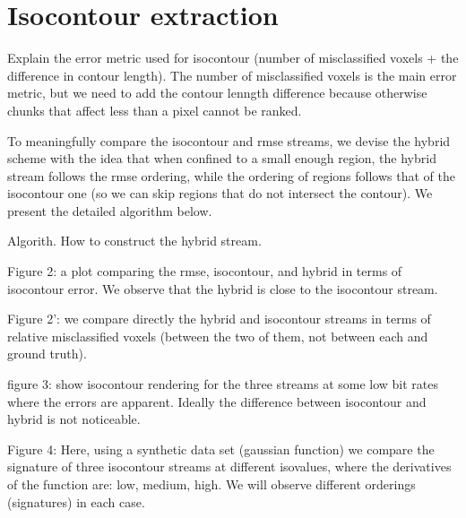 
\section{Isocontour extraction}
Explain the error metric used for isocontour (number of misclassified voxels + the difference in contour length). The number of misclassified voxels is the main error metric, but we need to add the contour lenngth difference because otherwise chunks that affect less than a pixel cannot be ranked.

To meaningfully compare the isocontour and rmse streams, we devise the hybrid scheme with the idea that when confined to a small enough region, the hybrid stream follows the rmse ordering, while the ordering of regions follows that of the isocontour one (so we can skip regions that do not intersect the contour). We present the detailed algorithm below.

Algorith. How to construct the hybrid stream.

Figure 2: a plot comparing the rmse, isocontour, and hybrid in terms of isocontour error. We observe that the hybrid is close to the isocontour stream.

Figure 2': we compare directly the hybrid and isocontour streams in terms of relative misclassified voxels (between the two of them, not between each and ground truth).

figure 3: show isocontour rendering for the three streams at some low bit rates where the errors are apparent. Ideally the difference between isocontour and hybrid is not noticeable.


Figure 4:
Here, using a synthetic data set (gaussian function) we compare the signature of three isocontour streams at different isovalues, where the derivatives of the function are: low, medium, high. We will observe different orderings (signatures) in each case.


